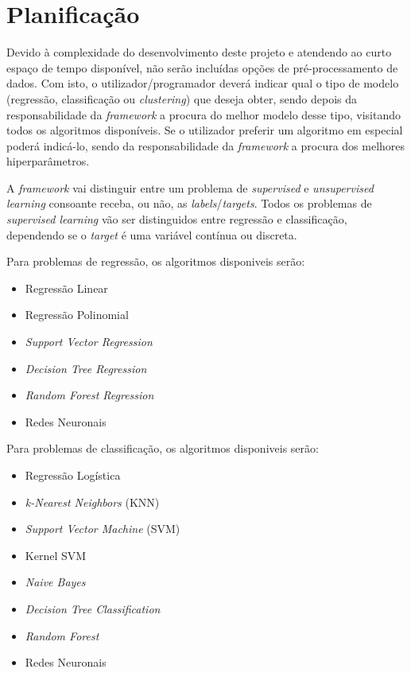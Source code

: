 \documentclass[a4paper]{article}
\begin{document}
\section{Planificação}
\normalsize{
    Devido à complexidade do desenvolvimento deste projeto e atendendo ao curto espaço de tempo disponível, não serão incluídas opções de pré-processamento de dados.
    Com isto, o utilizador/programador deverá indicar qual o tipo de modelo (regressão, classificação ou \textit{clustering}) que deseja obter, 
    sendo depois da responsabilidade da \textit{framework} a procura do melhor modelo desse tipo, visitando todos os algoritmos disponíveis.
    Se o utilizador preferir um algoritmo em especial poderá indicá-lo, sendo da responsabilidade da \textit{framework} a procura dos melhores hiperparâmetros.
    
    A \textit{framework} vai distinguir entre um problema de \textit{supervised} e \textit{unsupervised learning} consoante receba, ou não, as \textit{labels}/\textit{targets}.
    Todos os problemas de \textit{supervised learning} vão ser distinguidos entre regressão e classificação, dependendo se o \textit{target} é uma variável contínua ou discreta.
    
    Para problemas de regressão, os algoritmos disponiveis serão: 
    \begin{itemize}
        \item Regressão Linear
        \item Regressão Polinomial
        \item \textit{Support Vector Regression}
        \item \textit{Decision Tree Regression}
        \item \textit{Random Forest Regression}
        \item Redes Neuronais
    \end{itemize}
    
    Para problemas de classificação, os algoritmos disponiveis serão:
    \begin{itemize}
        \item Regressão Logística
        \item \textit{k-Nearest Neighbors} (KNN)
        \item \textit{Support Vector Machine} (SVM)
        \item Kernel SVM
        \item \textit{Naive Bayes}
        \item \textit{Decision Tree Classification}
        \item \textit{Random Forest}
        \item Redes Neuronais
    \end{itemize}
    
}
\end{document}
